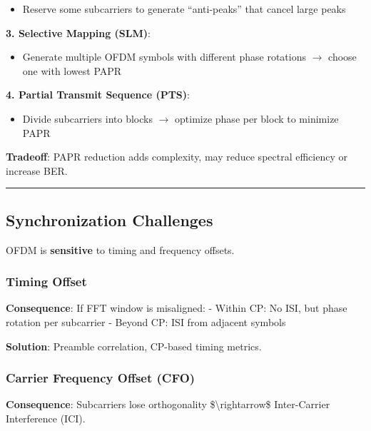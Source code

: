 \begin{itemize}
\item Reserve some subcarriers to generate ``anti-peaks'' that cancel large peaks
\end{itemize}

\textbf{3. Selective Mapping (SLM)}:

\begin{itemize}
\item Generate multiple OFDM symbols with different phase rotations $\rightarrow$ choose one with lowest PAPR
\end{itemize}

\textbf{4. Partial Transmit Sequence (PTS)}:

\begin{itemize}
\item Divide subcarriers into blocks $\rightarrow$ optimize phase per block to minimize PAPR
\end{itemize}

\textbf{Tradeoff}: PAPR reduction adds complexity, may reduce spectral
efficiency or increase BER.

\begin{center}\rule{0.5\linewidth}{0.5pt}\end{center}

\subsection{\texorpdfstring{ Synchronization
Challenges}{ Synchronization Challenges}}\label{synchronization-challenges}

OFDM is \textbf{sensitive} to timing and frequency offsets.

\subsubsection{Timing Offset}\label{timing-offset}

\textbf{Consequence}: If FFT window is misaligned: - Within CP: No ISI,
but phase rotation per subcarrier - Beyond CP: ISI from adjacent symbols

\textbf{Solution}: Preamble correlation, CP-based timing metrics.

\subsubsection{Carrier Frequency Offset
(CFO)}\label{carrier-frequency-offset-cfo}

\textbf{Consequence}: Subcarriers lose orthogonality
\$\textbackslash rightarrow\$ Inter-Carrier Interference (ICI).


